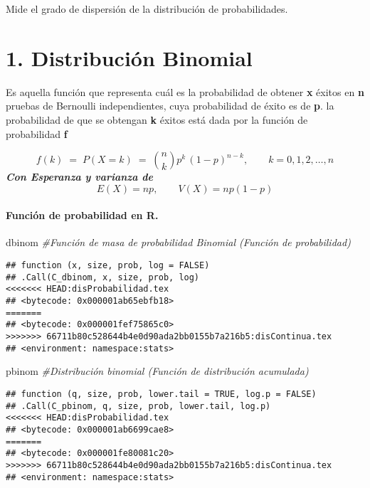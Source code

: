 \documentclass[
]{article}
\newenvironment{Shaded}{\begin{snugshade}}{\end{snugshade}}
\newcommand{\CommentTok}[1]{\textcolor[rgb]{0.56,0.35,0.01}{\textit{#1}}}
\newcommand{\NormalTok}[1]{#1}
\begin{document}
\pagebreak

Mide el grado de dispersión de la distribución de probabilidades.

\hypertarget{distribuciuxf3n-binomial}{%
\section{1. Distribución Binomial}\label{distribuciuxf3n-binomial}}

Es aquella función que representa cuál es la probabilidad de obtener
\textbf{x} éxitos en \textbf{n} pruebas de Bernoulli independientes,
cuya probabilidad de éxito es de \textbf{p}. \pagebreak la probabilidad
de que se obtengan \textbf{k} éxitos está dada por la función de
probabilidad \textbf{f}

\[f(k) \;=\; P(X=k)  \;=\; {n\choose k} p^k\, (1-p)^{n-k}, \qquad k=0,1,2, \ldots, n\]
\textbf{\emph{Con Esperanza y varianza de}}
\[E(X)= np, \qquad V(X)= np(1-p)\]

\hypertarget{funciuxf3n-de-probabilidad-en-r.}{%
\paragraph{Función de probabilidad en
R.}\label{funciuxf3n-de-probabilidad-en-r.}}

\begin{Shaded}
\begin{Highlighting}[]
\NormalTok{dbinom }\CommentTok{\#Función de masa de probabilidad Binomial (Función de probabilidad)}
\end{Highlighting}
\end{Shaded}

\begin{verbatim}
## function (x, size, prob, log = FALSE) 
## .Call(C_dbinom, x, size, prob, log)
<<<<<<< HEAD:disProbabilidad.tex
## <bytecode: 0x000001ab65ebfb18>
=======
## <bytecode: 0x000001fef75865c0>
>>>>>>> 66711b80c528644b4e0d90ada2bb0155b7a216b5:disContinua.tex
## <environment: namespace:stats>
\end{verbatim}

\begin{Shaded}
\begin{Highlighting}[]
\NormalTok{pbinom }\CommentTok{\#Distribución binomial (Función de distribución acumulada)}
\end{Highlighting}
\end{Shaded}

\begin{verbatim}
## function (q, size, prob, lower.tail = TRUE, log.p = FALSE) 
## .Call(C_pbinom, q, size, prob, lower.tail, log.p)
<<<<<<< HEAD:disProbabilidad.tex
## <bytecode: 0x000001ab6699cae8>
=======
## <bytecode: 0x000001fe80081c20>
>>>>>>> 66711b80c528644b4e0d90ada2bb0155b7a216b5:disContinua.tex
## <environment: namespace:stats>
\end{verbatim}
\end{document}
